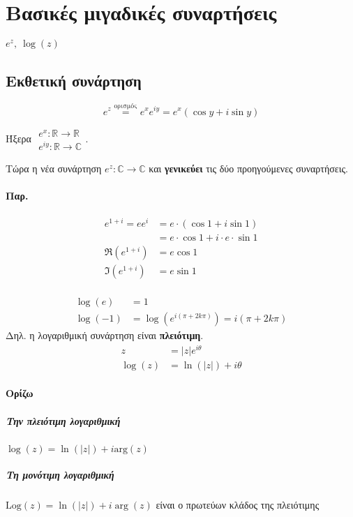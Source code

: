 \documentclass[12pt,a4paper,notitlepage,fleqn]{article}
\begin{document}
    \section{Βασικές μιγαδικές συναρτήσεις}
    \( e^z,\ \log(z) \)
    \subsection{Εκθετική συνάρτηση}
    \[
    e^z \overset{\text{ορισμός}}{=} e^xe^{iy}
    = e^x(\cos y+i\sin y)
    \]

    Ήξερα \( \begin{array}{l}
    e^x: \mathbb R \to \mathbb R  \\
    e^{iy}: \mathbb R \to \mathbb C
    \end{array} \).

    Τώρα η νέα συνάρτηση \( e^z: \mathbb C \to \mathbb C \) και \textbf{γενικεύει}
    τις δύο προηγούμενες συναρτήσεις.

    \paragraph{Παρ.}
    \begin{align*}
    e^{1+i}= ee^i &= e\cdot(\cos 1+i\sin 1) \\ &= e\cdot\cos1+i\cdot e\cdot \sin 1
    \\ \Re\left(e^{1+i}\right) &= e\cos1
    \\ \Im\left(e^{1+i}\right) &= e\sin1
    \end{align*}

    \paragraph{}
    \begin{align*}
    \log(e) &= 1 \\
    \log(-1) &= \log\left(e^{i(\pi+2k\pi)} \right) = i(\pi+2k\pi)
    \end{align*}
    Δηλ. η λογαριθμική συνάρτηση είναι \textbf{πλειότιμη}.
    \begin{align*}
    z &= |z|e^{i\theta} \\
    \log(z) &= \ln\left(|z|\right)+i\theta
    \end{align*}

    \paragraph{Ορίζω}
    \subparagraph{Την πλειότιμη λογαριθμική} \( \log(z) = \ln\left(|z|\right)+i\mathrm{arg}(z) \)
    \subparagraph{Τη μονότιμη λογαριθμική} \( \mathrm{Log}(z) = \ln\left(|z|\right)+i\arg(z)\)
    είναι ο πρωτεύων κλάδος της πλειότιμης
\end{document}
